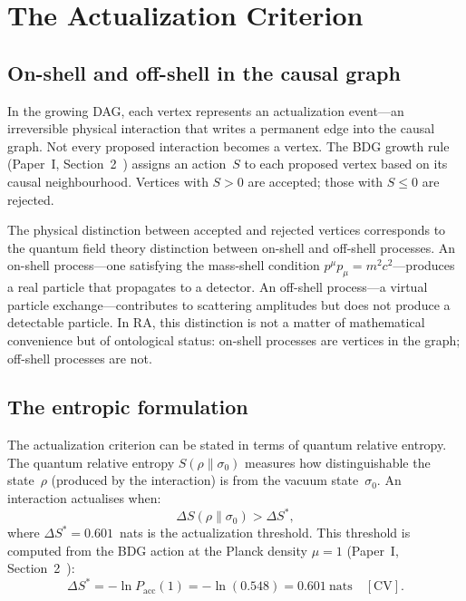 \documentclass[11pt,a4paper]{article}
\theoremstyle{plain}
\theoremstyle{definition}
\theoremstyle{remark}
\begin{document}
\section{The Actualization Criterion}\label{sec:criterion}

\subsection{On-shell and off-shell in the causal graph}\label{sec:onshell}

In the growing DAG, each vertex represents an actualization event---an irreversible
physical interaction that writes a permanent edge into the causal graph.  Not every
proposed interaction becomes a vertex.  The BDG growth rule (Paper~I,
Section~2~\cite{P1}) assigns an action~$S$ to each proposed vertex based on its
causal neighbourhood.  Vertices with $S > 0$ are accepted; those with $S \leq 0$ are
rejected.

The physical distinction between accepted and rejected vertices corresponds to the
quantum field theory distinction between on-shell and off-shell processes.  An
on-shell process---one satisfying the mass-shell condition
$p^\mu p_\mu = m^2 c^2$---produces a real particle that propagates to a detector.
An off-shell process---a virtual particle exchange---contributes to scattering
amplitudes but does not produce a detectable particle.  In RA, this distinction is
not a matter of mathematical convenience but of ontological status: on-shell
processes are vertices in the graph; off-shell processes are not.

\subsection{The entropic formulation}\label{sec:entropic}

The actualization criterion can be stated in terms of quantum relative entropy.  The
quantum relative entropy $S(\rho\|\sigma_0)$ measures how distinguishable the
state~$\rho$ (produced by the interaction) is from the vacuum state~$\sigma_0$.  An
interaction actualises when:
\begin{equation}
\Delta S(\rho\|\sigma_0) > \Delta S^*,
\label{eq:criterion}
\end{equation}
where $\Delta S^* = 0.601$~nats is the actualization threshold.  This threshold is
computed from the BDG action at the Planck density $\mu = 1$ (Paper~I,
Section~2~\cite{P1}):
\begin{equation}
\Delta S^* = -\ln P_{\mathrm{acc}}(1) = -\ln(0.548) = 0.601~\text{nats} \quad[\text{CV}].
\label{eq:threshold}
\end{equation}
\end{document}
